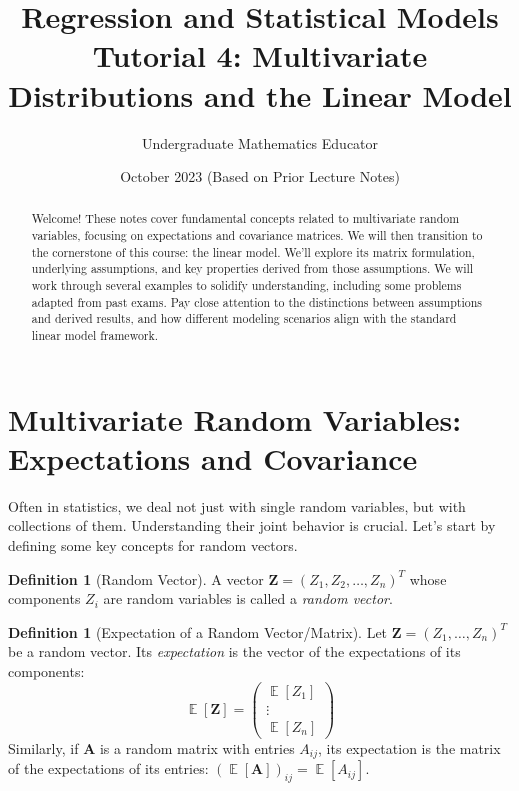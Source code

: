 \documentclass[11pt]{article}
\title{Regression and Statistical Models \\ \large Tutorial 4: Multivariate Distributions and the Linear Model}
\author{Undergraduate Mathematics Educator}
\date{October 2023 (Based on Prior Lecture Notes)}
\theoremstyle{definition}
\newtheorem{definition}[theorem]{Definition}
\theoremstyle{remark}
\DeclareMathOperator{\E}{\mathbb{E}}
\begin{document}
\maketitle

\begin{abstract}
    Welcome! These notes cover fundamental concepts related to multivariate random variables, focusing on expectations and covariance matrices. We will then transition to the cornerstone of this course: the linear model. We'll explore its matrix formulation, underlying assumptions, and key properties derived from those assumptions. We will work through several examples to solidify understanding, including some problems adapted from past exams. Pay close attention to the distinctions between assumptions and derived results, and how different modeling scenarios align with the standard linear model framework.
\end{abstract}

\section{Multivariate Random Variables: Expectations and Covariance}

Often in statistics, we deal not just with single random variables, but with collections of them. Understanding their joint behavior is crucial. Let's start by defining some key concepts for random vectors.

\begin{definition}[Random Vector]
    A vector $\bm{Z} = (Z_1, Z_2, \ldots, Z_n)^T$ whose components $Z_i$ are random variables is called a \emph{random vector}.
\end{definition}

\begin{definition}[Expectation of a Random Vector/Matrix]
    Let $\bm{Z} = (Z_1, \ldots, Z_n)^T$ be a random vector. Its \emph{expectation} is the vector of the expectations of its components:
    \[
    \E[\bm{Z}] = \begin{pmatrix} \E[Z_1] \\ \vdots \\ \E[Z_n] \end{pmatrix}
    \]
    Similarly, if $\bm{A}$ is a random matrix with entries $A_{ij}$, its expectation is the matrix of the expectations of its entries: $(\E[\bm{A}])_{ij} = \E[A_{ij}]$.
\end{definition}
\end{document}
